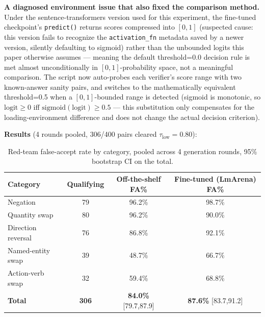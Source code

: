 \documentclass[11pt]{article}
\newcommand{\taulow}{\ensuremath{\tau_{\text{low}}}}
\newenvironment{fittab}{\begin{lrbox}{\fittabbox}}{\end{lrbox}%
  \ifdim\wd\fittabbox>\linewidth\resizebox{\linewidth}{!}{\usebox{\fittabbox}}\else\usebox{\fittabbox}\fi}
\begin{document}
\textbf{A diagnosed environment issue that also fixed the comparison method.} Under the sentence-transformers version used for this experiment, the fine-tuned checkpoint's \texttt{predict()} returns scores compressed into $[0, 1]$ (suspected cause: this version fails to recognize the \texttt{activation\_\allowbreak{}fn} metadata saved by a newer version, silently defaulting to sigmoid) rather than the unbounded logits this paper otherwise assumes --- meaning the default threshold=0.0 decision rule is met almost unconditionally in $[0,1]$-probability space, not a meaningful comparison. The script now auto-probes each verifier's score range with two known-answer sanity pairs, and switches to the mathematically equivalent threshold=0.5 when a $[0,1]$-bounded range is detected (sigmoid is monotonic, so $\mathrm{logit}\geq0$ iff $\mathrm{sigmoid}(\mathrm{logit})\geq0.5$ --- this substitution only compensates for the loading-environment difference and does not change the actual decision criterion).

\textbf{Results} (4 rounds pooled, 306/400 pairs cleared $\taulow=0.80$):

\begin{table}[h]
\centering
\small
\begin{fittab}\begin{tabular}{@{}lccc@{}}
\toprule
\textbf{Category} & \textbf{Qualifying} & \textbf{Off-the-shelf FA\%} & \textbf{Fine-tuned (LmArena) FA\%} \\
\midrule
Negation & 79 & 96.2\% & 98.7\% \\
Quantity swap & 80 & 96.2\% & 90.0\% \\
Direction reversal & 76 & 86.8\% & 92.1\% \\
Named-entity swap & 39 & 48.7\% & 66.7\% \\
Action-verb swap & 32 & 59.4\% & 68.8\% \\
\midrule
\textbf{Total} & \textbf{306} & \textbf{84.0\%} [79.7,87.9] & \textbf{87.6\%} [83.7,91.2] \\
\bottomrule
\end{tabular}\end{fittab}
\caption{Red-team false-accept rate by category, pooled across 4 generation rounds, 95\% bootstrap CI on the total.}
\end{table}
\end{document}
